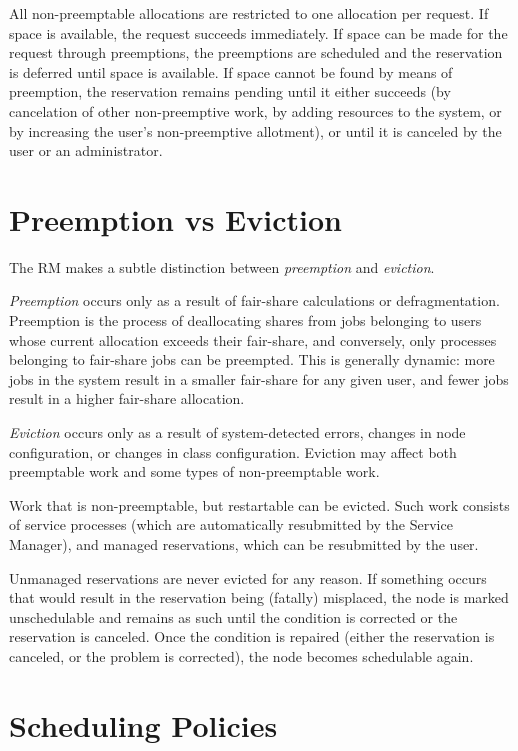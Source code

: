     All non-preemptable allocations are restricted to one allocation per request.  If space is
    available, the request succeeds immediately.  If space can be made for the request through
    preemptions, the preemptions are scheduled and the reservation is deferred until space
    is available.  If space cannot be found by means of preemption, the reservation remains
    pending until it either succeeds (by cancelation of other non-preemptive work, by
    adding resources to the system, or by increasing the user's non-preemptive allotment), or until
    it is canceled by the user or an administrator.

    \section{Preemption vs Eviction}
    The RM makes a subtle distinction between {\em preemption} and {\em eviction}.

    {\em Preemption} occurs only as a result of fair-share
    calculations or defragmentation.  Preemption is the process of
    deallocating shares from jobs belonging to users whose current
    allocation exceeds their fair-share, and conversely, only processes
    belonging to fair-share jobs can be preempted. This is generally 
    dynamic: more jobs in the system result in a smaller fair-share
    for any given user, and fewer jobs result in a higher fair-share
    allocation.

    {\em Eviction} occurs only as a result of system-detected errors,
    changes in node configuration, or changes in class
    configuration. Eviction may affect both preemptable work and some
    types of non-preemptable work.

    Work that is non-preemptable, but restartable can be evicted.  Such work consists of service
    processes (which are automatically resubmitted by the Service Manager), and managed reservations,
    which can be resubmitted by the user.

    Unmanaged reservations are never evicted for any reason.  If something occurs that
    would result in the reservation being (fatally) misplaced, the node is marked
    unschedulable and remains as such until the condition is corrected or the reservation
    is canceled.  Once the condition is repaired (either the reservation is canceled, or
    the problem is corrected), the node becomes schedulable again.

    \section{Scheduling Policies}

